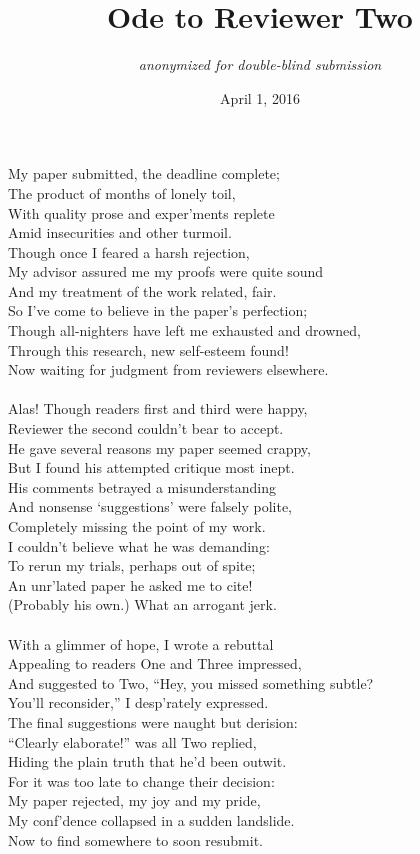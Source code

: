 \documentclass{article}
\title{Ode to Reviewer Two}
\author{{\em anonymized for double-blind submission}}
\date{April 1, 2016}
\begin{document}
\maketitle
\thispagestyle{empty}

\noindent
My paper submitted, the deadline complete;\\
The product of months of lonely toil,\\
With quality prose and exper'ments replete\\
Amid insecurities and other turmoil.\\
Though once I feared a harsh rejection,\\
My advisor assured me my proofs were quite sound\\
And my treatment of the work related, fair.\\
So I've come to believe in the paper's perfection;\\
Though all-nighters have left me exhausted and drowned,\\
Through this research, new self-esteem found!\\
Now waiting for judgment from reviewers elsewhere.\\
\\
Alas! Though readers first and third were happy,\\
Reviewer the second couldn't bear to accept.\\
He gave several reasons my paper seemed crappy,\\
But I found his attempted critique most inept.\\
His comments betrayed a misunderstanding\\
And nonsense `suggestions' were falsely polite,\\
Completely missing the point of my work.\\
I couldn't believe what he was demanding:\\
To rerun my trials, perhaps out of spite;\\
An unr'lated paper he asked me to cite!\\
(Probably his own.) What an arrogant jerk.\\
\\
With a glimmer of hope, I wrote a rebuttal\\
Appealing to readers One and Three impressed,\\
And suggested to Two, ``Hey, you missed something subtle?\\
You'll reconsider,'' I desp'rately expressed.\\
The final suggestions were naught but derision:\\
``Clearly elaborate!'' was all Two replied,\\
Hiding the plain truth that he'd been outwit.\\
For it was too late to change their decision:\\
My paper rejected, my joy and my pride,\\
My conf'dence collapsed in a sudden landslide.\\
Now to find somewhere to soon resubmit.\\
\end{document}
